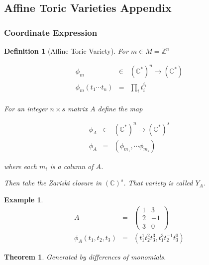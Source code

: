 \documentclass[11pt]{book}
\theoremstyle{change}
\newtheorem{definition}[equation]{Definition}
\newtheorem{theorem}[equation]{Theorem}
\newtheorem{example}[equation]{Example}
\theoremstyle{nonumberplain}
\numberwithin{equation}{section}
\begin{document}
\subsection{Affine Toric Varieties Appendix}

\subsubsection{Coordinate Expression}

\begin{definition}[Affine Toric Variety]

For $m \in M = \mathbb{Z}^n$

\begin{eqnarray*}
\phi_m  &\in& (\mathbb{C}^*)^n \to (\mathbb{C}^*)\\
\phi_m (t_1 \cdots t_n) &=& \prod_i t_i^{i_i}\\
\end{eqnarray*}

For an integer $n \times s$ matrix $A$ define the map

\begin{eqnarray*}
\phi_A &\in& (\mathbb{C}^*)^n \to (\mathbb{C}^*)^s\\
\phi_A &=& (\phi_{m_1}, \cdots \phi_{m_s})
\end{eqnarray*}

where each $m_i$ is a column of $A$.

Then take the Zariski closure in $(\mathbb{C})^s$. That variety is called $Y_A$.

\end{definition}

\begin{example}
\begin{eqnarray*}
A &=& \begin{pmatrix}
1 & 3\\
2 & -1\\
3 & 0
\end{pmatrix}\\
\phi_A (t_1 , t_2 , t_3 ) &=& (t_1^1 t_2^2 t_3^3 , t_1^3 t_2^{-1} t_3^0 )
\end{eqnarray*}
\end{example}

\begin{theorem}
Generated by differences of monomials.
\end{theorem}
\end{document}
